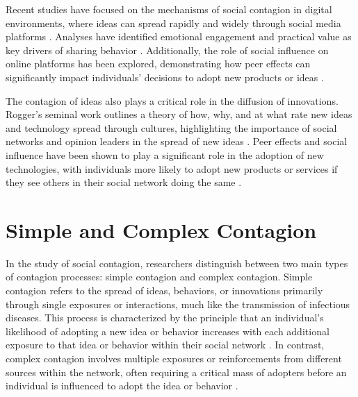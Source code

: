 Recent studies have focused on the mechanisms of social contagion in digital environments, where ideas can spread rapidly and widely through social media platforms \cite{online-platforms, jstor}. Analyses have identified emotional engagement and practical value as key drivers of sharing behavior \cite{ferrara-2015, steinert-2022}. Additionally, the role of social influence on online platforms has been explored, demonstrating how peer effects can significantly impact individuals' decisions to adopt new products or ideas \cite{jensen-2015}.

The contagion of ideas also plays a critical role in the diffusion of innovations. Rogger's seminal work outlines a theory of how, why, and at what rate new ideas and technology spread through cultures, highlighting the importance of social networks and opinion leaders in the spread of new ideas \cite{rogers2014}. Peer effects and social influence have been shown to play a significant role in the adoption of new technologies, with individuals more likely to adopt new products or services if they see others in their social network doing the same \cite{valente-1996, bollinger-2012}.

\section{\label{sec:Simple and Complex Contagion} Simple and Complex Contagion}

In the study of social contagion, researchers distinguish between two main types of contagion processes: simple contagion and complex contagion. Simple contagion refers to the spread of ideas, behaviors, or innovations primarily through single exposures or interactions, much like the transmission of infectious diseases. This process is characterized by the principle that an individual's likelihood of adopting a new idea or behavior increases with each additional exposure to that idea or behavior within their social network \cite{granovetter-1978,christakis2007spread, fowler2009cooperative}. In contrast, complex contagion involves multiple exposures or reinforcements from different sources within the network, often requiring a critical mass of adopters before an individual is influenced to adopt the idea or behavior \cite{centola-2007,centola-2010}.

